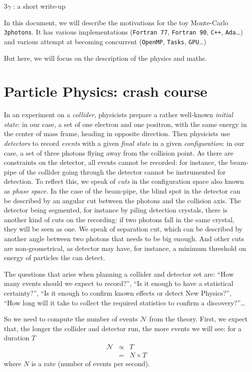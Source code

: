 \documentclass[a4paper]{article}
\begin{document}
\centerline{\Large 3$\gamma$ : a short write-up}


In this document, we will describe the motivations for the toy Monte-Carlo \texttt{3photons}.
It has various implementations
(\texttt{Fortran 77}, \texttt{Fortran 90}, \texttt{C++},
\texttt{Ada}…) and various attempt at becoming concurrent (\texttt{OpenMP},
\texttt{Tasks}, \texttt{GPU}…)

But here, we will focus on the description of the physics and maths.

\section{Particle Physics: crash course}
In an experiment on a \emph{collider}, physicists prepare a rather well-known \emph{initial state}: in our case, a set of one electron and one positron, with the same energy in the center of mass frame, heading in opposite direction.
Then physicists use \emph{detectors} to record \emph{events} with a given \emph{final state} in a given \emph{configuration}: in our case, a set of three photons flying away from the collision point.
As there are constraints on the detector, all events cannot be recorded: for instance, the beam-pipe of the collider going through the detector cannot be instrumented for detection. To reflect this, we speak of \emph{cuts} in the configuration space also known as \emph{phase space}. In the case of the beam-pipe, the blind spot in the detector can be described by an angular cut between the photons and the collision axis.
The detector being segmented, for instance by piling detection crystals, there is another kind of cuts on the recording: if two photons fall in the same crystal, they will be seen as one. We speak of separation cut, which can be described by another angle between two photons that needs to be big enough.
And other cuts are non-geometrical, as detector may have, for instance, a minimum threshold on energy of particles the can detect.

The questions that arise when planning a collider and detector set are: ``How many events should we expect to record?'', ``Is it enough to have a statistical certainty?'', ``Is it enough to confirm known effects or detect New Physics?'', ``How long will it take to collect the required statistics to confirm a discovery?''…

So we need to compute the number of events $\mathcal{N}$ from the theory.
First, we expect that, the longer the collider and detector run, the more events we will see: for a duration $T$
\begin{eqnarray}
  \mathcal{N} & \propto & T \\
  &=& N \times T
\end{eqnarray}
where $N$ is a rate (number of events per second).
\end{document}
